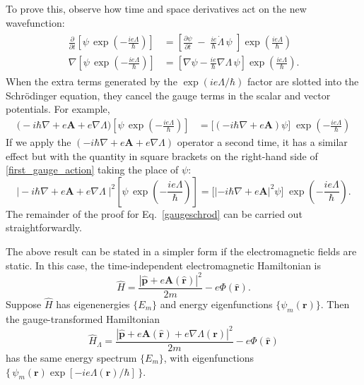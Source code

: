 \documentclass[prx,12pt]{revtex4-2}
\begin{document}
To prove this, observe how time and space derivatives act on the new
wavefunction:
\begin{align}
  \begin{aligned}
    \frac{\partial}{\partial t} \left[\psi \, \exp\left(-\frac{ie\Lambda}{\hbar}\right)\right] &=
    \left[\frac{\partial\psi}{\partial t} \;-\; \frac{ie}{\hbar} \dot{\Lambda}\, \psi
      \,\, \right] \exp\left(\frac{ie\Lambda}{\hbar}\right)\\
    \nabla \left[\psi \, \exp\left(-\frac{ie\Lambda}{\hbar}\right)\right] &=
    \left[\nabla \psi - \frac{ie}{\hbar} \nabla \Lambda \,\psi \right] \exp\left(\frac{ie\Lambda}{\hbar}\right).
  \end{aligned}
\end{align}
When the extra terms generated by the $\exp(ie\Lambda/\hbar)$ factor
are slotted into the Schr\"odinger equation, they cancel the gauge
terms in the scalar and vector potentials.  For example,
\begin{align}
  \Big(-i\hbar\nabla + e\mathbf{A} + e\nabla\Lambda\Big)
  \left[\psi \, \exp\left(-\frac{ie\Lambda}{\hbar}\right)\right] &=
  \Big[\left(-i\hbar\nabla + e\mathbf{A}\right)\psi\Big]\;
  \exp\left(-\frac{ie\Lambda}{\hbar}\right)
  \label{first_gauge_action}
\end{align}
If we apply the $(-i\hbar\nabla + e\mathbf{A} + e\nabla\Lambda)$
operator a second time, it has a similar effect but with the quantity
in square brackets on the right-hand side of
\eqref{first_gauge_action} taking the place of $\psi$:
\begin{equation}
  \Big|-i\hbar\nabla + e\mathbf{A} + e\nabla\Lambda\;\Big|^2
  \left[\psi \, \exp\left(-\frac{ie\Lambda}{\hbar}\right)\right]  
  =   \Big[\left|-i\hbar\nabla + e\mathbf{A}\right|^2\psi\Big]\;
  \exp\left(-\frac{ie\Lambda}{\hbar}\right).
\end{equation}
The remainder of the proof for Eq.~\eqref{gaugeschrod} can be carried
out straightforwardly.

The above result can be stated in a simpler form if the
electromagnetic fields are static.  In this case, the time-independent
electromagnetic Hamiltonian is
\begin{equation}
  \hat{H} = \frac{|\hat{\mathbf{p}}+e\mathbf{A}(\hat{\mathbf{r}})|^2}{2m}
  - e\Phi(\hat{\mathbf{r}}).
\end{equation}
Suppose $\hat{H}$ has eigenenergies $\{E_m \}$ and energy
eigenfunctions $\{\psi_m(\mathbf{r})\}$.  Then the gauge-transformed
Hamiltonian
\begin{equation}
  \hat{H}_\Lambda = \frac{|\hat{\mathbf{p}}+e\mathbf{A}(\hat{\mathbf{r}}) + e\nabla\Lambda(\mathbf{r})|^2}{2m}
  - e\Phi(\hat{\mathbf{r}})
\end{equation}
has the same energy spectrum $\{E_m\}$, with eigenfunctions
$\{\,\psi_m(\mathbf{r}) \exp[-ie\Lambda(\mathbf{r})/\hbar]\,\}$.
\end{document}
